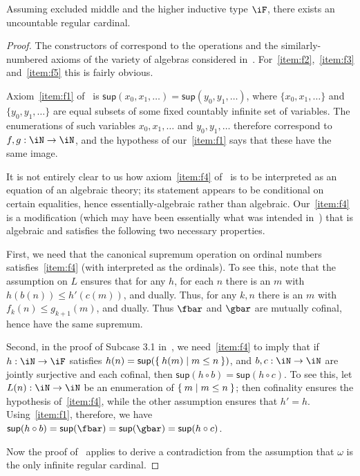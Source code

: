 \documentclass{amsart}
\let\N\iN
\let\sec\S
\let\S\cS
\def\sup{\mathsf{sup}}
\begin{document}
\begin{thm}[{cf.\ \cite[\sec9]{blass:freealg}}]
  Assuming excluded middle and the higher inductive type $\iF$, there exists an uncountable regular cardinal.
\end{thm}
\begin{proof}
  The constructors of \iF correspond to the operations and the similarly-numbered axioms of the variety of algebras considered in~\cite[\sec9]{blass:freealg}.
  For~\ref{item:f2},~\ref{item:f3} and~\ref{item:f5} this is fairly obvious.

  Axiom~\ref{item:f1} of~\cite[\sec9]{blass:freealg} is $\sup(x_0,x_1,\dots) =\sup(y_0,y_1,\dots)$, where $\{x_0,x_1,\dots\}$ and $\{y_0,y_1,\dots\}$ are equal subsets of some fixed countably infinite set of variables.
  The enumerations of such variables $x_0,x_1,\dots$ and $y_0,y_1,\dots$ therefore correspond to $f,g:\N\to\N$, and the hypothess of our~\ref{item:f1} says that these have the same image.

  It is not entirely clear to us how axiom~\ref{item:f4} of~\cite[\sec9]{blass:freealg} is to be interpreted as an equation of an algebraic theory; its statement appears to be conditional on certain equalities, hence essentially-algebraic rather than algebraic.
  Our~\ref{item:f4} is a modification (which may have been essentially what was intended in~\cite[\sec9]{blass:freealg}) that is algebraic and satisfies the following two necessary properties.

  First, we need that the canonical supremum operation on ordinal numbers satisfies~\ref{item:f4} (with \iF interpreted as the ordinals).
  To see this, note that the assumption on $L$ ensures that for any $h$, for each $n$ there is an $m$ with $h(b(n))\le h'(c(m))$, and dually.
  Thus, for any $k,n$ there is an $m$ with $f_k(n) \le g_{k+1}(m)$, and dually.
  Thus $\fbar$ and $\gbar$ are mutually cofinal, hence have the same supremum.

  Second, in the proof of Subcase 3.1 in~\cite[\sec9]{blass:freealg}, we need~\ref{item:f4} to imply that if $h:\N\to\iF$ satisfies $h(n) = \sup(\setof{ h(m) | m\le n})$, and $b,c:\N\to\N$ are jointly surjective and each cofinal, then $\sup(h\circ b)=\sup(h\circ c)$.
  To see this, let $L(n):\N\to\N$ be an enumeration of $\Set{m|m\le n}$; then cofinality ensures the hypothesis of~\ref{item:f4}, while the other assumption ensures that $h'=h$.
  Using~\ref{item:f1}, therefore, we have $\sup(h\circ b) = \sup(\fbar) = \sup(\gbar) = \sup(h\circ c)$.

  Now the proof of~\cite[\sec9]{blass:freealg} applies to derive a contradiction from the assumption that $\omega$ is the only infinite regular cardinal.
\end{proof}
\end{document}
